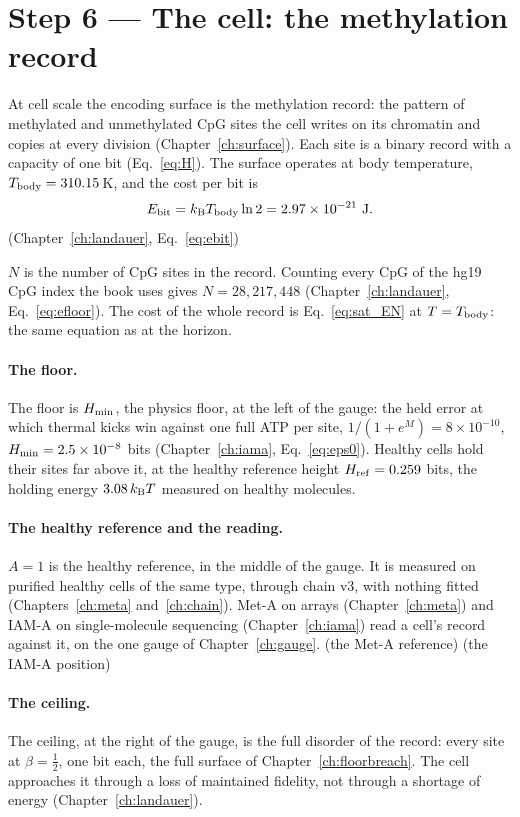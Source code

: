 \section{Step 6 --- The cell: the methylation record}\label{app:sat:step6}
At cell scale the encoding surface is the methylation record: the pattern of methylated and unmethylated CpG sites the cell writes on its
chromatin and copies at every division (Chapter~\ref{ch:surface}). Each site is a binary record with a capacity of one bit
(Eq.~\eqref{eq:H}). The surface operates at body temperature, $T_{\mathrm{body}}=310.15$\,K, and the cost per bit is
\begin{equation}
E_{\rm bit}=k_{\mathrm B}T_{\mathrm{body}}\ln2=2.97\times10^{-21}\ {\rm J}. \label{eq:sat_ebit}
\end{equation}
\calc{} (Chapter~\ref{ch:landauer}, Eq.~\eqref{eq:ebit})

$N$ is the number of CpG sites in the record. Counting every CpG of the hg19 CpG index the book uses gives $N=28{,}217{,}448$
(Chapter~\ref{ch:landauer}, Eq.~\eqref{eq:efloor}). \calc{} The cost of the whole record is Eq.~\eqref{eq:sat_EN} at $T=T_{\mathrm{body}}$: the same
equation as at the horizon.

\paragraph{The floor.} The floor is $H_{\min}$, the physics floor, at the left of the gauge: the held error at which thermal kicks win against
one full ATP per site, $1/(1+e^{M})=8\times10^{-10}$, $H_{\min}=2.5\times10^{-8}$ bits (Chapter~\ref{ch:iama}, Eq.~\eqref{eq:eps0}). \calc{} Healthy
cells hold their sites far above it, at the healthy reference height $H_{\rm ref}=0.259$ bits, the holding energy $3.08\,k_{\mathrm B} T$ measured on
healthy molecules. \measured

\paragraph{The healthy reference and the reading.} $A=1$ is the healthy reference, in the middle of the gauge. It is measured on purified
healthy cells of the same type, through chain v3, with nothing fitted (Chapters~\ref{ch:meta} and~\ref{ch:chain}). Met-A on arrays
(Chapter~\ref{ch:meta}) and IAM-A on single-molecule sequencing (Chapter~\ref{ch:iama}) read a cell's record against it, on the one gauge of
Chapter~\ref{ch:gauge}. \calibrated{} (the Met-A reference) \measured{} (the IAM-A position)

\paragraph{The ceiling.} The ceiling, at the right of the gauge, is the full disorder of the record: every site at $\beta=\tfrac12$, one bit each, the full surface of
Chapter~\ref{ch:floorbreach}. \derived{} The cell approaches it through a loss of maintained fidelity, not through a shortage of energy
(Chapter~\ref{ch:landauer}).

